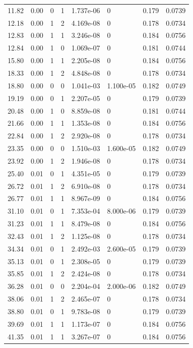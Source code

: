 \documentclass[preview]{standalone}
\begin{document}
{{\begin{tabular}{L{1.2cm}C{1.2cm} C{0.3cm}C{0.5cm} C{1.4cm}C{1.4cm} C{1.4cm}C{1.4cm}}
  11.82  &  0.00  & 0     &  1 &  1.737e-06  & 0  & 0.179 &  0.0739   \\ 
  12.18  &  0.00  & 1     &  2 &  4.169e-08  & 0  & 0.178 &  0.0734   \\ 
  12.83  &  0.00  & 1     &  1 &  3.246e-08  & 0  & 0.184 &  0.0756   \\ 
  12.84  &  0.00  & 1     &  0 &  1.069e-07  & 0  & 0.181 &  0.0744   \\ 
  15.80  &  0.00  & 1     &  1 &  2.205e-08  & 0  & 0.184 &  0.0756   \\ 
  18.33  &  0.00  & 1     &  2 &  4.848e-08  & 0  & 0.178 &  0.0734   \\ 
  18.80  &  0.00  & 0     &  0 &  1.041e-03  & 1.100e-05  & 0.182 &  0.0749   \\ 
  19.19  &  0.00  & 0     &  1 &  2.207e-05  & 0  & 0.179 &  0.0739   \\ 
  20.48  &  0.00  & 1     &  0 &  8.859e-08  & 0  & 0.181 &  0.0744   \\ 
  21.66  &  0.00  & 1     &  1 &  1.353e-08  & 0  & 0.184 &  0.0756   \\ 
  22.84  &  0.00  & 1     &  2 &  2.920e-08  & 0  & 0.178 &  0.0734   \\ 
  23.35  &  0.00  & 0     &  0 &  1.510e-03  & 1.600e-05  & 0.182 &  0.0749   \\ 
  23.92  &  0.00  & 1     &  2 &  1.946e-08  & 0  & 0.178 &  0.0734   \\ 
  25.40  &  0.01  & 0     &  1 &  4.351e-05  & 0  & 0.179 &  0.0739   \\ 
  26.72  &  0.01  & 1     &  2 &  6.910e-08  & 0  & 0.178 &  0.0734   \\ 
  26.77  &  0.01  & 1     &  1 &  8.967e-09  & 0  & 0.184 &  0.0756   \\ 
  31.10  &  0.01  & 0     &  1 &  7.353e-04  & 8.000e-06  & 0.179 &  0.0739   \\ 
  31.23  &  0.01  & 1     &  1 &  8.479e-08  & 0  & 0.184 &  0.0756   \\ 
  32.43  &  0.01  & 1     &  2 &  1.125e-08  & 0  & 0.178 &  0.0734   \\ 
  34.34  &  0.01  & 0     &  1 &  2.492e-03  & 2.600e-05  & 0.179 &  0.0739   \\ 
  35.13  &  0.01  & 0     &  1 &  2.308e-05  & 0  & 0.179 &  0.0739   \\ 
  35.85  &  0.01  & 1     &  2 &  2.424e-08  & 0  & 0.178 &  0.0734   \\ 
  36.28  &  0.01  & 0     &  0 &  2.204e-04  & 2.000e-06  & 0.182 &  0.0749   \\ 
  38.06  &  0.01  & 1     &  2 &  2.465e-07  & 0  & 0.178 &  0.0734   \\ 
  38.80  &  0.01  & 0     &  1 &  9.783e-08  & 0  & 0.179 &  0.0739   \\ 
  39.69  &  0.01  & 1     &  1 &  1.173e-07  & 0  & 0.184 &  0.0756   \\ 
  41.35  &  0.01  & 1     &  1 &  3.267e-07  & 0  & 0.184 &  0.0756   \\ 
\hline 
\end{tabular} 

}}
\end{document}
